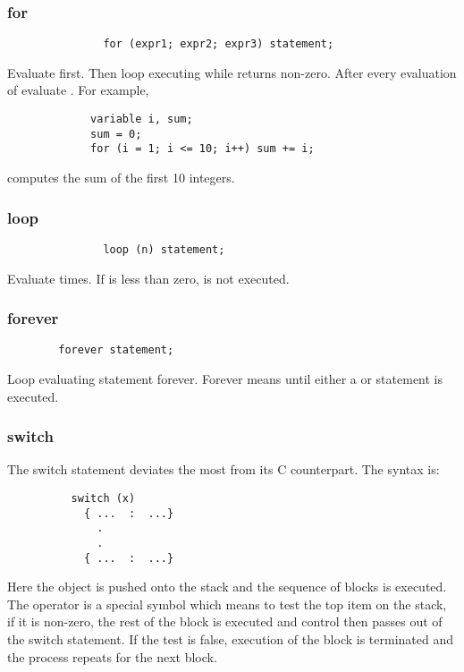 \subsubsection{for}
\begin{verbatim}   
               for (expr1; expr2; expr3) statement;
\end{verbatim}
        Evaluate  first.  Then loop executing  while
         returns non-zero.  After every evaluation of 
        evaluate .  For example,
\begin{verbatim}
             variable i, sum;
             sum = 0;
             for (i = 1; i <= 10; i++) sum += i;
\end{verbatim}
        computes the sum of the first 10 integers.
          
\subsubsection{loop}
\begin{verbatim}
               loop (n) statement;
\end{verbatim}
        Evaluate   times.  If  is less than
	zero,  is not executed.
       
\subsubsection{forever}
\begin{verbatim}    
        forever statement;
\end{verbatim}
       Loop evaluating statement forever.  Forever means until either a
        or  statement is executed.
       
\subsubsection{switch}
    
       The switch statement deviates the most from its C counterpart.  The
       syntax is:
\begin{verbatim}
          switch (x)
            { ...  :  ...}
              .
              .
            { ...  :  ...}
\end{verbatim}
        Here the object  is pushed onto the stack and the sequence of
        blocks is executed.  The \var{:} operator is a \slang{} special symbol
        which means to test the top item on the stack, if it is non-zero,
        the rest of the block is executed and control then passes out of the
        switch statement.  If the test is false, execution of the block is
        terminated and the process repeats for the next block.
        
